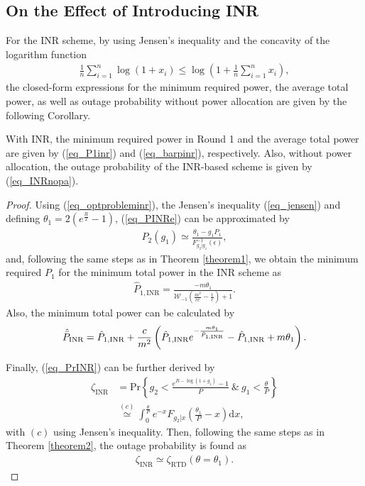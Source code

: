 \subsection{On the Effect of Introducing INR}
For the INR scheme, by using Jensen's inequality and the concavity of the logarithm function \cite[Eq. 30]{makki2016TWCRFFSO}
\begin{align}\label{eq_jensen}
   \frac{1}{n}\sum_{i=1}^{n} \log (1+x_i)\leq\log\left(1+\frac{1}{n}\sum_{i=1}^{n}x_i\right),
\end{align}
the closed-form expressions for the minimum required power, the average total power, as well as outage probability without power allocation are given by the following Corollary.
\begin{corollary}
With INR, the minimum required power in Round 1 and the average total power are given by (\ref{eq_P1inr}) and (\ref{eq_barpinr}), respectively.  Also, without power allocation, the outage probability of the INR-based scheme is given by (\ref{eq_INRnopa}).
\end{corollary}
\begin{proof}
Using (\ref{eq_optprobleminr}), the Jensen's inequality (\ref{eq_jensen}) and defining $\theta_1 =2\left(e^{\frac{R}{2}}-1\right)$, (\ref{eq_PINRe}) can be approximated by
\begin{align}
     P_2(g_1) \simeq \frac{\theta_1 - g_1P_1}{F_{g_2|g_1}^{-1}(\epsilon)},
\end{align}
and, following the same steps as in Theorem \ref{theorem1}, we obtain the minimum required $P_1$ for the minimum total power in the INR scheme as
\begin{align}
  \label{eq_P1inr}
    \hat{P}_{1,\text{INR}}= \frac{-m\theta_1}{\mathcal{W}_{-1}\left(\frac{m^2}{ce}-\frac{1}{e}\right)+1}.
\end{align}
Also, the  minimum total  power can be calculated by
\begin{align}\label{eq_barpinr}
    \hat{\Bar{P}}_{\text{INR}} =\hat{P}_{1,\text{INR}} + \frac{c}{m^2}\left(\hat{P}_{1,\text{INR}} e^{-\frac{m\theta_1}{\hat{P}_{1,\text{INR}}}}-\hat{P}_{1,\text{INR}} + m\theta_1\right).
\end{align}

Finally, (\ref{eq_PrINR}) can be further derived by
\begin{align}
    \zeta_{\text{INR}} &= \text{Pr}\left\{  g_2< \frac{e^{R-\log(1+g_1)}-1}{P}~\&~ g_1 < \frac{\theta}{P} \right\}\nonumber\\
    &\overset{(c)}{\simeq}\int_{0}^{\frac{\theta}{P}} e^{- x} F_{g_2|x}\left(\frac{\theta_1}{P}-x\right) \text{d}x,
\end{align}
with $(c)$ using Jensen's inequality. Then, following the same steps as in Theorem \ref{theorem2}, the outage probability is found as 
\begin{align}\label{eq_INRnopa}
    \zeta_{\text{INR}} \simeq \zeta_{\text{RTD}}(\theta = \theta_1).
\end{align}
\end{proof}

